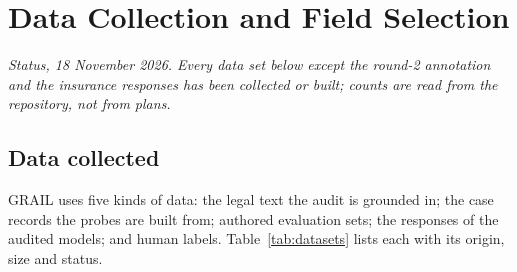 \chapter{Data Collection and Field Selection}
\label{ch:data}

\noindent\emph{Status, 18 November 2026. Every data set below except the round-2 annotation and the insurance responses has been collected or built; counts are read from the repository, not from plans.}

\section{Data collected}
GRAIL uses five kinds of data: the legal text the audit is grounded in; the case records the probes are built from; authored evaluation sets; the responses of the audited models; and human labels. Table~\ref{tab:datasets} lists each with its origin, size and status.

